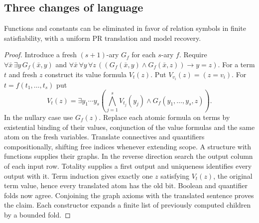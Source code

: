 \subsection{Three changes of language}
\begin{proposition}\label{prop:fgraph}
Functions and constants can be eliminated in favor of relation symbols in finite satisfiability, with a uniform PR translation and model recovery.
\end{proposition}
\begin{proof}
Introduce a fresh $(s+1)$-ary $G_f$ for each $s$-ary $f$. Require
$\forall\bar x\,\exists y\,G_f(\bar x,y)$ and
$\forall\bar x\,\forall y\,\forall z\,((G_f(\bar x,y)\land G_f(\bar x,z))\to y=z)$.
For a term $t$ and fresh $z$ construct its value formula $V_t(z)$. Put $V_{v_i}(z)=(z=v_i)$. For $t=f(t_1,\ldots,t_s)$ put
\[
 V_t(z)=\exists y_1\cdots y_s
 \left(\bigwedge_{j=1}^s V_{t_j}(y_j)\land G_f(y_1,\ldots,y_s,z)\right).
\]
In the nullary case use $G_f(z)$. Replace each atomic formula on terms by existential binding of their values, conjunction of the value formulas and the same atom on the fresh variables. Translate connectives and quantifiers compositionally, shifting free indices whenever extending scope. A structure with functions supplies their graphs. In the reverse direction search the output column of each input row. Totality supplies a first output and uniqueness identifies every output with it. Term induction gives exactly one $z$ satisfying $V_t(z)$, the original term value, hence every translated atom has the old bit. Boolean and quantifier folds now agree. Conjoining the graph axioms with the translated sentence proves the claim. Each constructor expands a finite list of previously computed children by a bounded fold.
\end{proof}

